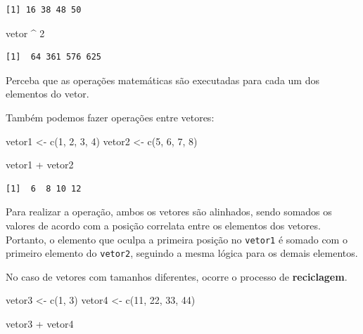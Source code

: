\documentclass[
  brazilian,
]{book}
\newenvironment{Shaded}{\begin{snugshade}}{\end{snugshade}}
\newcommand{\DecValTok}[1]{\textcolor[rgb]{0.00,0.00,0.81}{#1}}
\newcommand{\FunctionTok}[1]{\textcolor[rgb]{0.00,0.00,0.00}{#1}}
\newcommand{\NormalTok}[1]{#1}
\newcommand{\OtherTok}[1]{\textcolor[rgb]{0.56,0.35,0.01}{#1}}
\newcommand{\SpecialCharTok}[1]{\textcolor[rgb]{0.00,0.00,0.00}{#1}}
\begin{document}
\begin{verbatim}
[1] 16 38 48 50
\end{verbatim}

\begin{Shaded}
\begin{Highlighting}[]
\NormalTok{vetor }\SpecialCharTok{\^{}} \DecValTok{2}
\end{Highlighting}
\end{Shaded}

\begin{verbatim}
[1]  64 361 576 625
\end{verbatim}

Perceba que as operações matemáticas são executadas para cada um dos elementos do vetor.

Também podemos fazer operações entre vetores:

\begin{Shaded}
\begin{Highlighting}[]
\NormalTok{vetor1 }\OtherTok{\textless{}{-}} \FunctionTok{c}\NormalTok{(}\DecValTok{1}\NormalTok{, }\DecValTok{2}\NormalTok{, }\DecValTok{3}\NormalTok{, }\DecValTok{4}\NormalTok{)}
\NormalTok{vetor2 }\OtherTok{\textless{}{-}} \FunctionTok{c}\NormalTok{(}\DecValTok{5}\NormalTok{, }\DecValTok{6}\NormalTok{, }\DecValTok{7}\NormalTok{, }\DecValTok{8}\NormalTok{)}

\NormalTok{vetor1 }\SpecialCharTok{+}\NormalTok{ vetor2}
\end{Highlighting}
\end{Shaded}

\begin{verbatim}
[1]  6  8 10 12
\end{verbatim}

Para realizar a operação, ambos os vetores são alinhados, sendo somados os valores de acordo com a posição correlata entre os elementos dos vetores. Portanto, o elemento que oculpa a primeira posição no \texttt{vetor1} é somado com o primeiro elemento do \texttt{vetor2}, seguindo a mesma lógica para os demais elementos.

No caso de vetores com tamanhos diferentes, ocorre o processo de \textbf{reciclagem}.

\begin{Shaded}
\begin{Highlighting}[]
\NormalTok{vetor3 }\OtherTok{\textless{}{-}} \FunctionTok{c}\NormalTok{(}\DecValTok{1}\NormalTok{, }\DecValTok{3}\NormalTok{)}
\NormalTok{vetor4 }\OtherTok{\textless{}{-}} \FunctionTok{c}\NormalTok{(}\DecValTok{11}\NormalTok{, }\DecValTok{22}\NormalTok{, }\DecValTok{33}\NormalTok{, }\DecValTok{44}\NormalTok{)}

\NormalTok{vetor3 }\SpecialCharTok{+}\NormalTok{ vetor4}
\end{Highlighting}
\end{Shaded}
\end{document}
